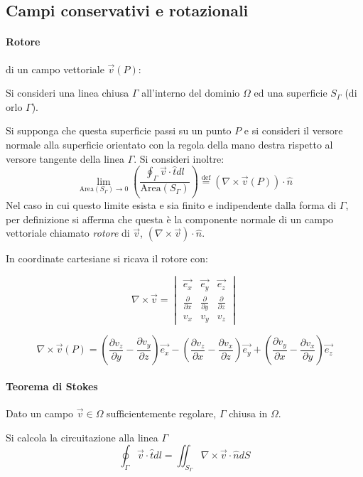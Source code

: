 \subsection{Campi conservativi e rotazionali}
\paragraph{Rotore} di un campo vettoriale $\vec{v}(P)$:

Si consideri una linea chiusa $\Gamma$ all'interno del dominio $\Omega$ ed una superficie
$S_\Gamma$ (di orlo $\Gamma$).

Si supponga che questa superficie passi su un punto $P$ e si consideri il versore normale alla 
superficie orientato con la regola della mano destra rispetto al versore tangente della linea $\Gamma$.
Si consideri inoltre:
$$
\lim_{\text{Area}(S_\Gamma)\to 0}\left(\frac{\oint_{\Gamma} \vec{v}\cdot\hat{t}dl}{\text{Area}(S_\Gamma)}\right) \stackrel{\text{def}}{=} \left(\nabla\times\vec{v}(P)\right)\cdot\hat{n}
$$
Nel caso in cui questo limite esista e sia finito e indipendente dalla forma di $\Gamma$, per definizione
si afferma che questa è la componente normale di un campo vettoriale chiamato \textit{rotore} di $\vec{v}$,
$(\nabla \times \vec{v})\cdot \hat{n}$.

In coordinate cartesiane si ricava il rotore con:

$$
\nabla \times \vec{v} =
\begin{vmatrix}
\vec{e_x} & \vec{e_y} & \vec{e_z} \\
\frac{\partial}{\partial x} & \frac{\partial}{\partial y} & \frac{\partial}{\partial z} \\
v_x & v_y & v_z
\end{vmatrix}
$$

$$
\nabla\times{\vec{v}}(P) = \left(\frac{\partial v_z}{\partial y} - \frac{\partial v_y}{\partial z}\right)\vec{e_x} -
\left(\frac{\partial v_z}{\partial x} - \frac{\partial v_x}{\partial z}\right)\vec{e_y} +
\left(\frac{\partial v_y}{\partial x} - \frac{\partial v_x}{\partial y}\right)\vec{e_z}
$$

\paragraph{Teorema di Stokes}
Dato un campo $\vec{v} \in \Omega$ sufficientemente regolare, $\Gamma$ chiusa in $\Omega$.

Si calcola la circuitazione alla linea $\Gamma$
$$
\oint_\Gamma \vec{v}\cdot\hat{t} dl = \iint_{S_\Gamma} \nabla\times \vec{v} \cdot \hat{n} dS
$$

